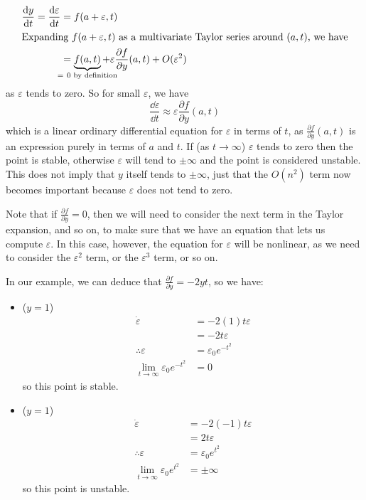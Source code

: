 \documentclass{article}
\begin{document}
\begin{align*}
    \frac{\dd{y}}{\dd{t}} = \frac{\dd \varepsilon}{\dd{t}} & = f(a + \varepsilon, t)                                                                                                            \\
    \intertext{Expanding $f(a + \varepsilon, t)$ as a multivariate Taylor series around $(a, t)$, we have}
                                                           & = \underbrace{f(a, t)}_{\mathclap{=\ 0\text{ by definition}}} + \varepsilon \frac{\partial f}{\partial y}(a, t) + O(\varepsilon^2)
\end{align*}
as $\varepsilon$ tends to zero. So for small $\varepsilon$, we have
\[ \frac{\dd \varepsilon}{\dd{t}} \approx \varepsilon \frac{\partial f}{\partial y}(a, t) \]
which is a linear ordinary differential equation for $\varepsilon$ in terms of $t$, as $\frac{\partial f}{\partial y}(a, t)$ is an expression purely in terms of $a$ and $t$. If (as $t \to \infty$) $\varepsilon$ tends to zero then the point is stable, otherwise $\varepsilon$ will tend to $\pm \infty$ and the point is considered unstable. This does not imply that $y$ itself tends to $\pm \infty$, just that the $O(n^2)$ term now becomes important because $\varepsilon$ does not tend to zero.

Note that if $\frac{\partial f}{\partial y} = 0$, then we will need to consider the next term in the Taylor expansion, and so on, to make sure that we have an equation that lets us compute $\varepsilon$. In this case, however, the equation for $\varepsilon$ will be nonlinear, as we need to consider the $\varepsilon^2$ term, or the $\varepsilon^3$ term, or so on.

In our example, we can deduce that $\frac{\partial f}{\partial y} = -2yt$, so we have:
\begin{itemize}
    \item ($y = 1$) \begin{align*}
              \dot \varepsilon                           & = -2(1)t \varepsilon     \\
                                                         & = -2t\varepsilon         \\
              \therefore \varepsilon                     & = \varepsilon_0 e^{-t^2} \\
              \lim_{t \to \infty} \varepsilon_0 e^{-t^2} & = 0
          \end{align*}
          so this point is stable.
    \item ($y = 1$) \begin{align*}
              \dot \varepsilon                          & = -2(-1)t \varepsilon   \\
                                                        & = 2t\varepsilon         \\
              \therefore \varepsilon                    & = \varepsilon_0 e^{t^2} \\
              \lim_{t \to \infty} \varepsilon_0 e^{t^2} & = \pm\infty
          \end{align*}
          so this point is unstable.
\end{itemize}
\end{document}
